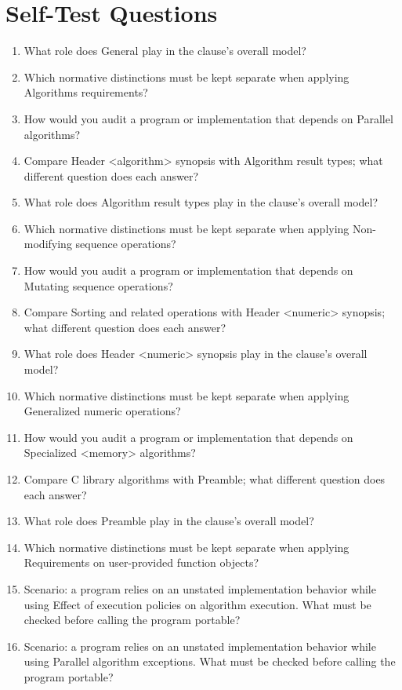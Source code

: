 \documentclass[11pt,letterpaper]{article}
\begin{document}
\section{Self-Test Questions}
\begin{enumerate}
\item What role does General play in the clause's overall model?
\item Which normative distinctions must be kept separate when applying Algorithms requirements?
\item How would you audit a program or implementation that depends on Parallel algorithms?
\item Compare Header <algorithm> synopsis with Algorithm result types; what different question does each answer?
\item What role does Algorithm result types play in the clause's overall model?
\item Which normative distinctions must be kept separate when applying Non-modifying sequence operations?
\item How would you audit a program or implementation that depends on Mutating sequence operations?
\item Compare Sorting and related operations with Header <numeric> synopsis; what different question does each answer?
\item What role does Header <numeric> synopsis play in the clause's overall model?
\item Which normative distinctions must be kept separate when applying Generalized numeric operations?
\item How would you audit a program or implementation that depends on Specialized <memory> algorithms?
\item Compare C library algorithms with Preamble; what different question does each answer?
\item What role does Preamble play in the clause's overall model?
\item Which normative distinctions must be kept separate when applying Requirements on user-provided function objects?
\item Scenario: a program relies on an unstated implementation behavior while using Effect of execution policies on algorithm execution. What must be checked before calling the program portable?
\item Scenario: a program relies on an unstated implementation behavior while using Parallel algorithm exceptions. What must be checked before calling the program portable?
\end{enumerate}
\end{document}
